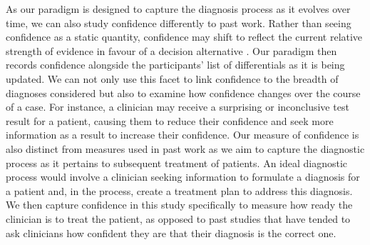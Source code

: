 \documentclass[a4paper, nobind]{templates/ociamthesis}
\begin{document}
\hfill\break
As our paradigm is designed to capture the diagnosis process as it evolves over time, we can also study confidence differently to past work. Rather than seeing confidence as a static quantity, confidence may shift to reflect the current relative strength of evidence in favour of a decision alternative \autocite{vickers_effects_1982}. Our paradigm then records confidence alongside the participants' list of differentials as it is being updated. We can not only use this facet to link confidence to the breadth of diagnoses considered but also to examine how confidence changes over the course of a case. For instance, a clinician may receive a surprising or inconclusive test result for a patient, causing them to reduce their confidence and seek more information as a result to increase their confidence. Our measure of confidence is also distinct from measures used in past work as we aim to capture the diagnostic process as it pertains to subsequent treatment of patients. An ideal diagnostic process would involve a clinician seeking information to formulate a diagnosis for a patient and, in the process, create a treatment plan to address this diagnosis. We then capture confidence in this study specifically to measure how ready the clinician is to treat the patient, as opposed to past studies that have tended to ask clinicians how confident they are that their diagnosis is the correct one.
\end{document}
